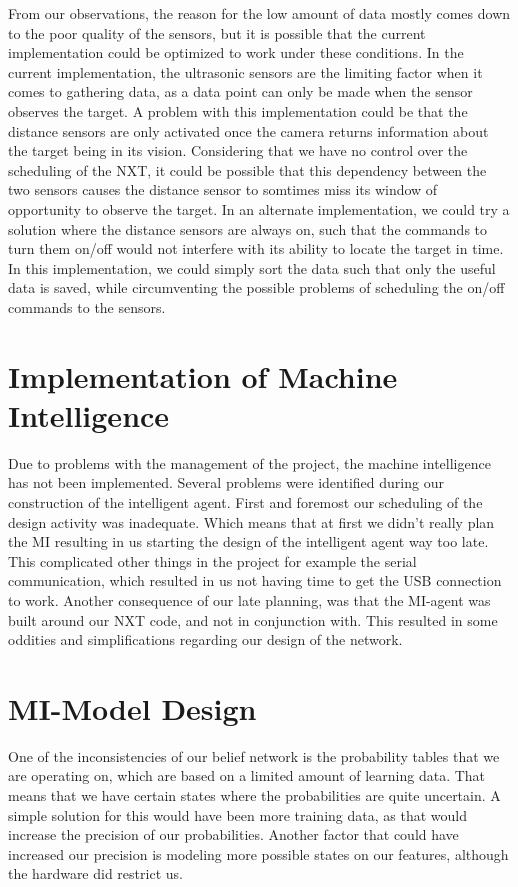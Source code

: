 From our observations, the reason for the low amount of data mostly comes down
to the poor quality of the sensors, but it is possible that the current
implementation could be optimized to work under these conditions. In the current
implementation, the ultrasonic sensors are the limiting factor when it comes to
gathering data, as a data point can only be made when the sensor observes the
target.
A problem with this implementation could be that the distance sensors are only
activated once the camera returns information about the target being in its
vision. Considering that we have no control over the scheduling of the NXT, it
could be possible that this dependency between the two sensors causes the
distance sensor to somtimes miss its window of opportunity to observe the
target.
In an alternate implementation, we could try a solution where the distance
sensors are always on, such that the commands to turn them on/off would not
interfere with its ability to locate the target in time. In this implementation,
we could simply sort the data such that only the useful data is saved, while
circumventing the possible problems of scheduling the on/off commands to the
sensors.

\section{Implementation of Machine Intelligence}
Due to problems with the management of the project, the machine intelligence has
not been implemented. Several problems were identified during our construction
of the intelligent agent. First and foremost our scheduling of the design
activity was inadequate. Which means that at first we didn't really plan the MI
resulting in us starting the design of the intelligent agent way too late. This
complicated other things in the project for example the serial communication,
which resulted in us not having time to get the USB connection to work. Another
consequence of our late planning, was that the MI-agent was built around our NXT
code, and not in conjunction with. This resulted in some oddities and
simplifications regarding our design of the network.


\section{MI-Model Design}
One of the inconsistencies of our belief network is the probability tables that
we are operating on, which are based on a limited amount of learning data. That
means that we have certain states where the probabilities are quite uncertain. A
simple solution for this would have been more training data, as that would
increase the precision of our probabilities. Another factor that could have
increased our precision is modeling more possible states on our features,
although the hardware did restrict us.

